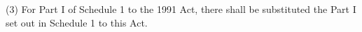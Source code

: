 \documentclass[12pt,a4paper]{article}
\begin{document}
%
%
%
%
%
%
%
%
%
%
%
%
%
%
%
%
%
%
%
%
(3) For Part I of Schedule 1 to the 1991 Act, there shall be substituted the Part I set out in Schedule 1 to this Act.
\end{document}
